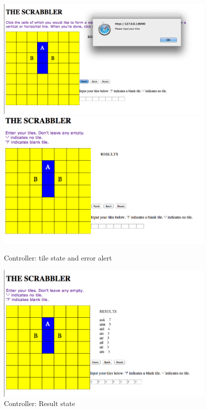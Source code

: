 \documentclass[11pt, oneside]{article}
\begin{document}
\begin{figure}[hl]
\caption{Controller: tile state and error alert}
\includegraphics[width=0.95\textwidth]{c3.png}
\includegraphics[width=0.95\textwidth]{c4.png}
\end{figure}

\begin{figure}[hl]
\caption{Controller: Result state}
\includegraphics[width=0.95\textwidth]{c5.png}
\end{figure}


\end{document}

